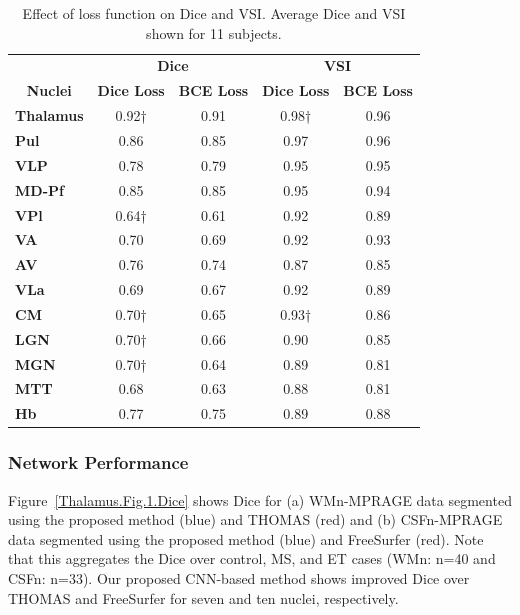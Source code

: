 \begin{table}[]
\centering
\caption{Effect of loss function on Dice and VSI. Average Dice and VSI shown for 11 subjects.}
\begin{tabular}{lcccc}
& \multicolumn{2}{c}{\textbf{Dice}}      & \multicolumn{2}{c}{\textbf{VSI}}       \\
\multicolumn{1}{c}{\textbf{Nuclei}} & \textbf{Dice Loss} & \textbf{BCE Loss} & \textbf{Dice Loss} & \textbf{BCE Loss} \\
\textbf{Thalamus}                    & 0.92† & 0.91 & 0.98† & 0.96 \\
\textbf{Pul}                         & 0.86  & 0.85 & 0.97  & 0.96 \\
\textbf{VLP}                         & 0.78  & 0.79 & 0.95  & 0.95 \\
\textbf{MD-Pf}                       & 0.85  & 0.85 & 0.95  & 0.94 \\
\textbf{VPl}                         & 0.64† & 0.61 & 0.92  & 0.89 \\
\textbf{VA}                          & 0.70  & 0.69 & 0.92  & 0.93 \\
\rowcolor[HTML]{FFFFFF}
\cellcolor[HTML]{D9D9D9}\textbf{AV}  & 0.76  & 0.74 & 0.87  & 0.85 \\
\rowcolor[HTML]{FFFFFF}
\cellcolor[HTML]{D9D9D9}\textbf{VLa} & 0.69  & 0.67 & 0.92  & 0.89 \\
\rowcolor[HTML]{FFFFFF}
\cellcolor[HTML]{D9D9D9}\textbf{CM}  & 0.70† & 0.65 & 0.93† & 0.86 \\
\rowcolor[HTML]{FFFFFF}
\cellcolor[HTML]{D9D9D9}\textbf{LGN} & 0.70† & 0.66 & 0.90  & 0.85 \\
\rowcolor[HTML]{FFFFFF}
\cellcolor[HTML]{D9D9D9}\textbf{MGN} & 0.70† & 0.64 & 0.89  & 0.81 \\
\rowcolor[HTML]{FFFFFF}
\cellcolor[HTML]{D9D9D9}\textbf{MTT} & 0.68  & 0.63 & 0.88  & 0.81 \\
\rowcolor[HTML]{FFFFFF}
\cellcolor[HTML]{D9D9D9}\textbf{Hb}  & 0.77  & 0.75 & 0.89  & 0.88
\end{tabular}\label{Thalamus.Table.2.Dice_VSI}
\end{table}



\subsubsection{Network Performance}
Figure~\ref{Thalamus.Fig.1.Dice} shows Dice for (a) WMn-MPRAGE data segmented using the proposed method (blue) and THOMAS (red) and (b) CSFn-MPRAGE data segmented using the proposed method (blue) and FreeSurfer (red). Note that this aggregates the Dice over control, MS, and ET cases (WMn: n=40 and CSFn: n=33). Our proposed CNN-based method shows improved Dice over THOMAS and FreeSurfer for seven and ten nuclei, respectively.


